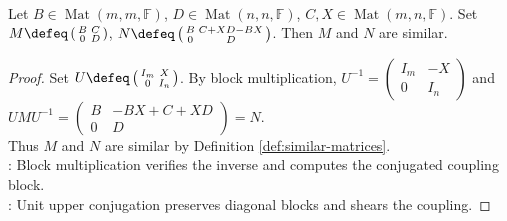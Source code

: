 \begin{proposition} \label{prop:upper-block-triangular-similarity-shift} \\
Let $B\in\operatorname{Mat}(m,m,\mathbb{F})$, $D\in\operatorname{Mat}(n,n,\mathbb{F})$,  $C,X\in\operatorname{Mat}(m,n,\mathbb{F})$. Set $M\defeq\left(\begin{smallmatrix}B&C\\0&D\end{smallmatrix}\right)$, $N\defeq\left(\begin{smallmatrix}B&C+XD-BX\\0&D\end{smallmatrix}\right)$. Then $M$ and $N$ are similar.
\begin{proof}
Set $U\defeq\left(\begin{smallmatrix}I_m&X\\0&I_n\end{smallmatrix}\right)$. By block multiplication, $U^{-1}=\left(\begin{smallmatrix}I_m&-X\\0&I_n\end{smallmatrix}\right)$ and $UMU^{-1}=\left(\begin{smallmatrix}B&-BX+C+XD\\0&D\end{smallmatrix}\right)=N$.\\
Thus $M$ and $N$ are similar by Definition \ref{def:similar-matrices}.\\
: Block multiplication verifies the inverse and computes the conjugated coupling block.\\
: Unit upper conjugation preserves diagonal blocks and shears the coupling.
\end{proof}
\end{proposition}
